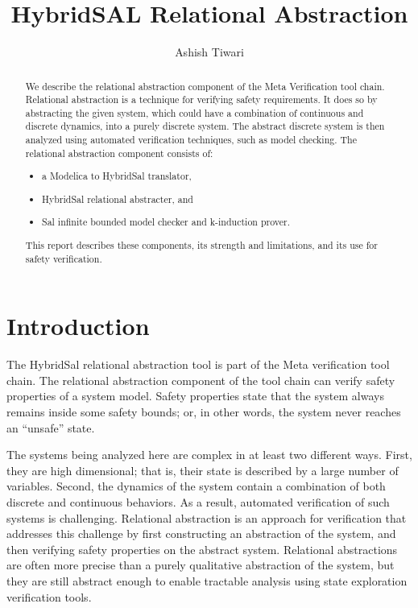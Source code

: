\documentclass{llncs}
\title{HybridSAL Relational Abstraction}
\author{Ashish Tiwari}
\institute{SRI International, Menlo Park, CA.\ \url{ashish.tiwari@sri.com}}
\begin{document}
\maketitle

\begin{abstract}
  We describe the relational abstraction component of the
  Meta Verification tool chain.
  Relational abstraction is a technique for verifying
  safety requirements.
  It does so by abstracting the given system, which could
  have a combination of continuous and discrete dynamics,  
  into a purely discrete system.
  The abstract discrete system is then analyzed using 
  automated verification techniques, such as model checking.
  The relational abstraction component consists of:
  \begin{itemize}
  \item a Modelica to HybridSal translator,
  \item HybridSal relational abstracter, and
  \item Sal infinite bounded model checker and k-induction prover.
  \end{itemize}
  This report describes these components, its strength and 
  limitations, and its use for safety verification.
\end{abstract}

\def\XX{\mathbb{X}}
\def\QQ{\mathbb{Q}}
\def\YY{\mathbb{Y}}
\def\RR{\mathbb{R}}
\def\ra{\rightarrow}
\def\bra{{\stackrel{a}{\ra}}}  %
\def\rra{{\stackrel{c}{\ra}}}  %

\section{Introduction}

  The HybridSal relational abstraction tool is
  part of the Meta verification tool chain.
  The relational abstraction component of the tool chain
  can verify safety properties of a system model.
  Safety properties state that the system always remains
  inside some safety bounds; or, in other words, the system
  never reaches an ``unsafe'' state.
  
  The systems being analyzed here are complex in at least two
  different ways. First, they are high dimensional; that is,
  their state is described by a large number of variables.
  Second, the dynamics of the system contain a combination of 
  both discrete and continuous behaviors.
  As a result, automated verification of such systems is challenging.
Relational abstraction is an approach for verification that addresses
this challenge by first constructing an abstraction of the system,
and then verifying safety properties on the abstract system.
Relational abstractions are often more precise than a purely
qualitative abstraction of the system, but they are still abstract
enough to enable tractable analysis using state exploration verification
tools.
\end{document}

